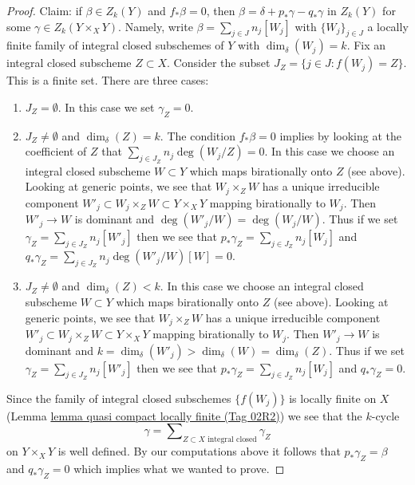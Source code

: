 \documentclass{amsart}
\theoremstyle{plain}
\theoremstyle{definition}
\theoremstyle{remark}
\numberwithin{equation}{subsection}
\begin{document}
\begin{proof}
\medskip\noindent
Claim: if $\beta \in Z_k(Y)$ and $f_*\beta = 0$, then
$\beta = \delta + p_*\gamma - q_*\gamma$ in $Z_k(Y)$ for some
$\gamma \in Z_k(Y \times_X Y)$. Namely, write $\beta = \sum_{j \in J} n_j[W_j]$
with $\{W_j\}_{j \in J}$ a locally finite family of integral closed
subschemes of $Y$ with $\dim_\delta(W_j) = k$.
Fix an integral closed subscheme $Z \subset X$. Consider the subset
$J_Z = \{j \in J : f(W_j) = Z\}$. This is a finite set. There are three
cases:
\begin{enumerate}
\item $J_Z = \emptyset$. In this case we set $\gamma_Z = 0$.
\item $J_Z \not = \emptyset$ and $\dim_\delta(Z) = k$.
The condition $f_*\beta = 0$ implies by looking at the
coefficient of $Z$ that $\sum_{j \in J_Z} n_j\deg(W_j/Z) = 0$.
In this case we choose an integral closed subscheme $W \subset Y$
which maps birationally onto $Z$ (see above). Looking at generic
points, we see that $W_j \times_Z W$ has a unique irreducible
component $W'_j \subset W_j \times_Z W \subset Y \times_X Y$
mapping birationally to $W_j$. Then $W'_j \to W$ is dominant
and $\deg(W'_j/W) = \deg(W_j/W)$. Thus if we set
$\gamma_Z = \sum_{j \in J_Z} n_j[W'_j]$
then we see that
$p_*\gamma_Z = \sum_{j \in J_Z} n_j[W_j]$ and
$q_*\gamma_Z = \sum_{j \in J_Z} n_j\deg(W'_j/W)[W] = 0$.
\item $J_Z \not = \emptyset$ and $\dim_\delta(Z) < k$.
In this case we choose an integral closed subscheme $W \subset Y$
which maps birationally onto $Z$ (see above). Looking at generic
points, we see that $W_j \times_Z W$ has a unique irreducible
component $W'_j \subset W_j \times_Z W \subset Y \times_X Y$
mapping birationally to $W_j$. Then $W'_j \to W$ is dominant
and $k = \dim_\delta(W'_j) > \dim_\delta(W) = \dim_\delta(Z)$.
Thus if we set $\gamma_Z = \sum_{j \in J_Z} n_j[W'_j]$
then we see that
$p_*\gamma_Z = \sum_{j \in J_Z} n_j[W_j]$ and
$q_*\gamma_Z = 0$.
\end{enumerate}
Since the family of integral closed subschemes $\{f(W_j)\}$
is locally finite on $X$
(Lemma \href{https://stacks.math.columbia.edu/tag/02R2}{lemma quasi compact locally finite (Tag 02R2)})
we see that the $k$-cycle
$$
\gamma = \sum\nolimits_{Z \subset X\text{ integral closed}} \gamma_Z
$$
on $Y \times_X Y$ is well defined. By our computations above it follows that
$p_*\gamma_Z = \beta$ and $q_*\gamma_Z = 0$ which implies
what we wanted to prove.
\end{proof}
\end{document}
